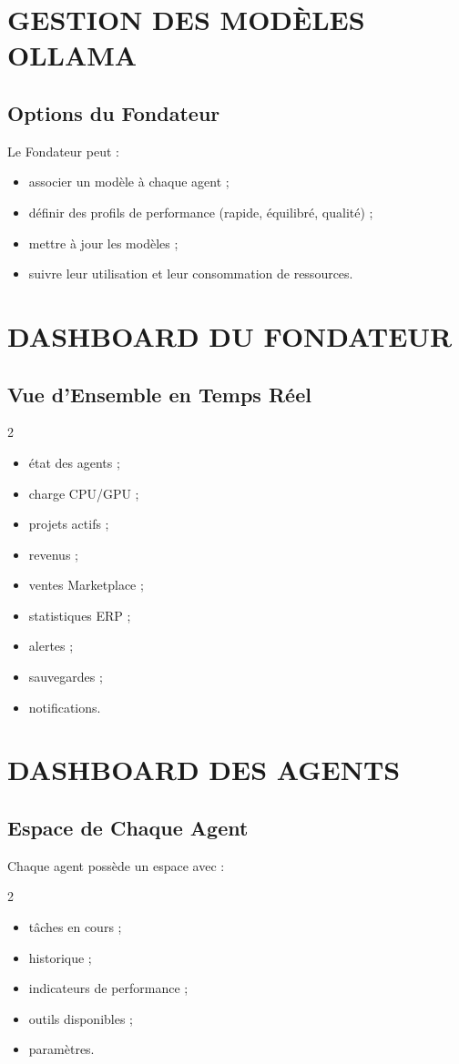 \documentclass[12pt,a4paper,oneside]{book}
\begin{document}
\chapter{GESTION DES MODÈLES OLLAMA}

\section{Options du Fondateur}
Le Fondateur peut :
\begin{itemize}
\item associer un modèle à chaque agent ;
\item définir des profils de performance (rapide, équilibré, qualité) ;
\item mettre à jour les modèles ;
\item suivre leur utilisation et leur consommation de ressources.
\end{itemize}

\chapter{DASHBOARD DU FONDATEUR}

\section{Vue d'Ensemble en Temps Réel}
\begin{multicols}{2}
\begin{itemize}
\item état des agents ;
\item charge CPU/GPU ;
\item projets actifs ;
\item revenus ;
\item ventes Marketplace ;
\item statistiques ERP ;
\item alertes ;
\item sauvegardes ;
\item notifications.
\end{itemize}
\end{multicols}

\chapter{DASHBOARD DES AGENTS}

\section{Espace de Chaque Agent}
Chaque agent possède un espace avec :
\begin{multicols}{2}
\begin{itemize}
\item tâches en cours ;
\item historique ;
\item indicateurs de performance ;
\item outils disponibles ;
\item paramètres.
\end{itemize}
\end{multicols}
\end{document}
